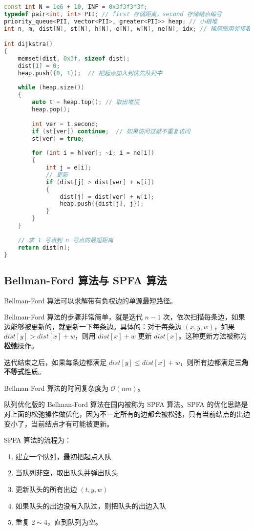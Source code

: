 \begin{lstlisting}[language=cpp]
const int N = 1e6 + 10, INF = 0x3f3f3f3f;
typedef pair<int, int> PII; // first 存储距离，second 存储结点编号
priority_queue<PII, vector<PII>, greater<PII>> heap; // 小根堆
int n, m, dist[N], st[N], h[N], e[N], w[N], ne[N], idx; // 稀疏图用邻接表存图

int dijkstra()
{
    memset(dist, 0x3f, sizeof dist);
    dist[1] = 0;
    heap.push({0, 1});  // 把起点加入到优先队列中
    
    while (heap.size())
    {
        auto t = heap.top(); // 取出堆顶
        heap.pop();
        
        int ver = t.second;
        if (st[ver]) continue;  // 如果访问过就不重复访问
        st[ver] = true;
        
        for (int i = h[ver]; ~i; i = ne[i])
        {
            int j = e[i];
            // 更新
            if (dist[j] > dist[ver] + w[i])
            {
                dist[j] = dist[ver] + w[i];
                heap.push({dist[j], j});
            }
        }
    }
    
    // 求 1 号点到 n 号点的最短距离
    return dist[n];
}
\end{lstlisting}

\subsection{Bellman-Ford 算法与 SPFA 算法}

Bellman-Ford 算法可以求解带有负权边的单源最短路径。

Bellman-Ford 算法的步骤非常简单，就是迭代 $n - 1$ 次，依次扫描每条边，如果边能够被更新的，就更新一下每条边。具体的：对于每条边 $(x, y, w)$，如果 $dist[y] > dist[x] + w$，则用 $dist[x] + w$ 更新 $dist[x]$。这种更新方法被称为\textbf{松弛}操作。

迭代结束之后，如果每条边都满足 $dist[y] \leq dist[x] + w$，则所有边都满足\textbf{三角不等式}性质。

Bellman-Ford 算法的时间复杂度为 $\mathcal{O}(nm)$。

队列优化版的 Bellman-Ford 算法在国内被称为 SPFA 算法。SPFA 的优化思路是对上面的松弛操作做优化，因为不一定所有的边都会被松弛，只有当前结点的出边变小了，当前结点才有可能被更新。

SPFA 算法的流程为：

\begin{enumerate}
\item 建立一个队列，最初把起点入队
\item 当队列非空，取出队头并弹出队头
\item 更新队头的所有出边 $(t, y, w)$
\item 如果队头的出边没有入队过，则把队头的出边入队
\item 重复 $2 \sim 4$，直到队列为空。
\end{enumerate}

